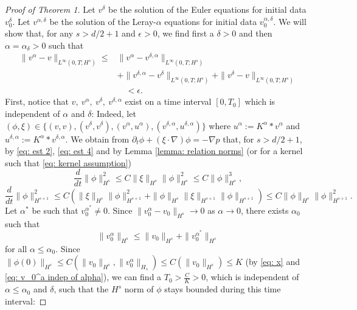 \documentclass{amsart}
\begin{document}
\begin{proof}[Proof of Theorem 1]
Let $v^{\delta}$ be the solution of the Euler equations for initial data $v_0^{\delta}$. Let $v^{\alpha,\delta}$ be the solution of the Leray-$\alpha$ equations for initial data $v_0^{\alpha,\delta}$. We will show that, for any $s>d/2+1$ and $\epsilon>0$, we find first a $\delta>0$ and then $\alpha =\alpha_\delta>0$ such that
\begin{equation}\label{eq: to show}
\begin{aligned}
 \|v^{\alpha} - v \|_{L^{\infty}(0,T;H^s)}\leq &\|v^{\alpha} - v^{\delta,\alpha}\|_{L^{\infty}(0,T;H^s)}\\
& + \|v^{\delta,\alpha} - v^{\delta}\|_{L^{\infty}(0,T;H^s)} + \|v^{\delta}- v \|_{L^{\infty}(0,T;H^s)}\\
		&\quad< \epsilon.
		\end{aligned}
\end{equation}
First, notice that $v, \ v^{\alpha}, \ v^{\delta}, \ v^{\delta,\alpha}$ exist on a time interval $[0,T_0]$ which is independent of $\alpha$ and $\delta$: Indeed, let $(\phi,\xi) \in \{(v,v), (v^{\delta},v^{\delta}), (v^{\alpha}, u^{\alpha}), (v^{\delta,\alpha}, u^{\delta,\alpha})\}$ where $u^{\alpha}:=K^{\alpha}*v^{\alpha}$ and $u^{\delta,\alpha}:=K^{\alpha}*v^{\delta,\alpha}$. We obtain from
$\partial_t \phi + (\xi \cdot \nabla) \phi = -\nabla p$
that, for $s>d/2+1$, by \eqref{eq: est 2}, \eqref{eq: est 4} and by Lemma \ref{lemma: relation norms} (or for a kernel such that \eqref{eq: kernel assumption})
\begin{equation}
    \label{eq: H^s estimate}
    \frac{d}{dt} \|\phi\|^2_{H^s} \leq C\|\xi\|_{H^s} \|\phi\|_{H^s}^2 \leq  C\|\phi\|_{H^s}^3,
\end{equation}
\begin{equation}
    \label{eq: H^s+1 estimate}
    \frac{d}{dt} \|\phi\|^2_{H^{s+1}} \leq C (\|\xi\|_{H^s} \|\phi\|_{H^{s+1}}^2 + \|\phi\|_{H^s} \|\xi\|_{H^{s+1}} \|\phi\|_{H^{s+1}}) \leq C \|\phi\|_{H^s} \|\phi\|_{H^{s+1}}^2.
\end{equation}
Let $\alpha^*$ be such that $v_0^{\alpha^*}\neq 0$. Since $\|v_0^{\alpha}-v_0\|_{H^s} \to 0$ as $\alpha \to 0$, there exists $\alpha_0$ such that 
\begin{equation}
\label{eq: v_0^a indep of alpha}
    \|v_0^{\alpha}\|_{H^s} \leq \|v_0\|_{H^s} + \|v_0^{\alpha^*}\|_{H^s}
\end{equation}
for all $\alpha \leq \alpha_0$. Since $\|\phi(0)\|_{H^s} \leq C(\|v_0\|_{H^s}, \|v_0^{\alpha}\|_{H_s}) \leq C(\|v_0\|_{H^s}) \leq K$ (by  \eqref{eq: x} and \eqref{eq: v_0^a indep of alpha}), we can find a $T_0>\frac{C}{K}>0$, which is independent of $\alpha \leq \alpha_0$ and $\delta$, such that the $H^s$ norm of $\phi$ stays bounded during this time interval:

\end{proof}
\end{document}
